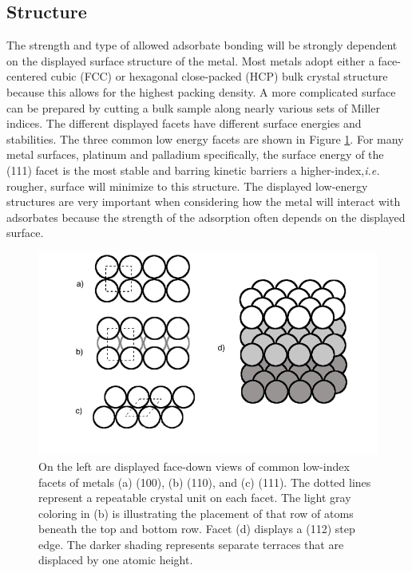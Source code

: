 \subsection{Structure}
The strength and type of allowed adsorbate bonding will be strongly dependent
on the displayed surface structure of the metal.  Most metals adopt either a
face-centered cubic (FCC) or hexagonal close-packed (HCP) bulk crystal
structure because this allows for the highest packing density. A more
complicated surface can be prepared by cutting a bulk sample along nearly
various sets of Miller indices. The different displayed facets have different
surface energies and stabilities. The three common low energy facets are shown
in Figure \ref{fig:facets}. For many metal surfaces, platinum and palladium
specifically, the surface energy of the (111) facet is the most stable and
barring kinetic barriers a higher-index,{\it i.e.} rougher, surface will minimize to this
structure. The displayed low-energy structures are very important when
considering how the metal will interact with adsorbates because the strength of
the adsorption often depends on the displayed surface.

\begin{figure}
  \includegraphics[width=\linewidth]{../figures/chap1/facets.pdf}
  \caption{On the left are displayed face-down views of common low-index facets
of metals (a) (100), (b) (110), and (c) (111). The dotted lines represent a
repeatable crystal unit on each facet. The light gray coloring in (b) is
illustrating the placement of that row of atoms beneath the top and bottom row.
Facet (d) displays a (112) step edge. The darker shading represents separate
terraces that are displaced by one atomic height.}
\label{fig:facets}
\end{figure}

